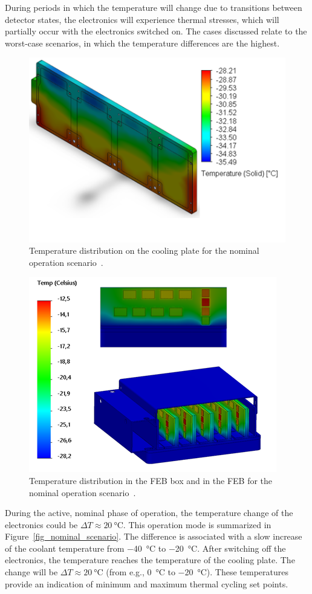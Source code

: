 During periods in which the temperature will change due to transitions between detector states, the electronics will experience thermal stresses, which will partially occur with the electronics switched on. The cases discussed relate to the worst-case scenarios, in which the temperature differences are the highest. 
    
\begin{figure}[!h]
\centering
\includegraphics[width=0.6\columnwidth]{Chapter4/images/cooling_block_nominal.png}
\caption{Temperature distribution on the cooling plate for the nominal operation scenario~\cite{Agarwal}.}
\label{fig_coolinkg_block_nominal}
\end{figure}

\newpage

\begin{figure}[!h]
\centering
\includegraphics[width=0.62\columnwidth]{Chapter4/images/nominal_febs.png}
\caption{Temperature distribution in the \gls{FEB} box and in the \gls{FEB} for the nominal operation scenario~\cite{Agarwal}.}
\label{fig_nominal_febs}
\end{figure}


During the active, nominal phase of operation, the temperature change of the electronics could be $\Delta T \approx \SI{20}{\celsius}$. This operation mode is summarized in Figure~\ref{fig_nominal_scenario}.  The difference is associated with a slow increase of the coolant temperature from \SI{-40}{\celsius} to \SI{-20}{\celsius}. After switching off the electronics, the temperature reaches the temperature of the cooling plate. The change will be $\Delta T \approx \SI{20}{\celsius}$ (from e.g., \SI{0}{\celsius} to \SI{-20}{\celsius}). These temperatures provide an indication of minimum and maximum thermal cycling set points.  

